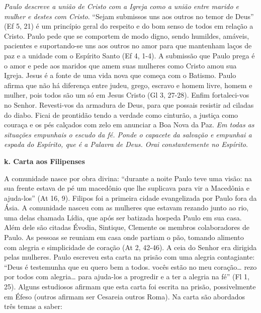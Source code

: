 \documentclass[
]{book}
\begin{document}
\emph{Paulo descreve a união de Cristo com a Igreja como a união entre marido e mulher e destes com Cristo}. ``Sejam submissos uns aos outros no temor de Deus'' (Ef 5, 21) é um princípio geral do respeito e do bom senso de todos em relação a Cristo. Paulo pede que se comportem de modo digno, sendo humildes, amáveis, pacientes e suportando-se uns aos outros no amor para que mantenham laços de paz e a unidade com o Espírito Santo (Ef 4, 1-4). A submissão que Paulo prega é o amor e pede aos maridos que amem suas mulheres como Cristo amou sua Igreja. Jesus é a fonte de uma vida nova que começa com o Batismo. Paulo afirma que não há diferença entre judeu, grego, escravo e homem livre, homem e mulher, pois todos são um só em Jesus Cristo (Gl 3, 27-28). Enfim fortaleci-vos no Senhor. Revesti-vos da armadura de Deus, para que possais resistir ad ciladas do diabo. Ficai de prontidão tendo a verdade como cinturão, a justiça como couraça e os pés calçados com zelo em anunciar a Boa Nova da Paz. \emph{Em todas as situações empunhais o escudo da fé. Ponde o capacete da salvação e empunhai a espada do Espírito, que é a Palavra de Deus. Orai constantemente no Espírito}.

\textbf{k. Carta aos Filipenses}

A comunidade nasce por obra divina: ``durante a noite Paulo teve uma visão: na sua frente estava de pé um macedônio que lhe suplicava para vir a Macedônia e ajuda-los'' (At 16, 9). Filipos foi a primeira cidade evangelizada por Paulo fora da Ásia. A comunidade nasceu com as mulheres que estavam rezando junto ao rio, uma delas chamada Lídia, que após ser batizada hospeda Paulo em sua casa. Além dele são citadas Évodia, Sintique, Clemente os membros colaboradores de Paulo. As pessoas se reuniam em casa onde partiam o pão, tomando alimento com alegria e simplicidade de coração (At 2, 42-46). A ceia do Senhor era dirigida pelas mulheres. Paulo escreveu esta carta na prisão com uma alegria contagiante: ``Deus é testemunha que eu quero bem a todos. vocês estão no meu coração\ldots{} rezo por todos com alegria\ldots{} para ajuda-los a progredir e a ter a alegria na fé'' (Fl 1, 25). Alguns estudiosos afirmam que esta carta foi escrita na prisão, possivelmente em Éfeso (outros afirmam ser Cesareia outros Roma). Na carta são abordados três temas a saber:
\end{document}
